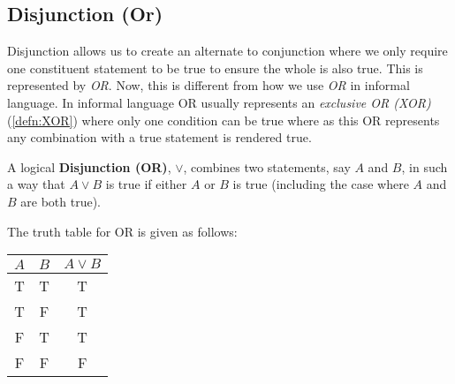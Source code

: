 \subsection{Disjunction (Or)}

Disjunction allows us to create an alternate to conjunction where we only require one constituent statement to be true to ensure the whole is also true.
This is represented by \emph{OR}.
Now, this is different from how we use \emph{OR} in informal language.
In informal language OR usually represents an \emph{exclusive OR (XOR)} (\ref{defn:XOR}) where only one condition can be true where as this OR represents any combination with a true statement is rendered true.

\begin{defn}
  \label{defn:Disjunction}
  \label{defn:OR}
  A logical \textbf{Disjunction (OR)}, $\lor$, combines two statements, say $A$ and $B$, in such a way that $A\lor B$ is true if either $A$ or $B$ is true (including the case where $A$ and $B$ are both true).
\end{defn}


The truth table for OR is given as follows:

\begin{minipage}{\linewidth}
  \centering
  \begin{tabular}{ccc}
    $A$ & $B$ & $A \lor B$ \\
    \toprule
    T & T & T \\
    T & F & T \\
    F & T & T \\
    F & F & F \\
  \end{tabular}
  \label{tab:disjunction} 
\end{minipage}

